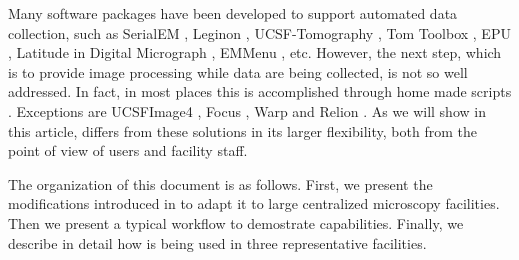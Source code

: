 Many software packages have been developed to support automated data collection, such as SerialEM \citep{Mastronarde2005}, Leginon \citep{Suloway2009}, UCSF-Tomography \citep{Zheng2007}, Tom Toolbox \citep{Nickell2005}, EPU \citep{EPU}, Latitude in Digital Micrograph \citep{Latitude}, EMMenu \citep{emmenu}, etc. However, the next step,  which is to provide image processing while  data are being collected, is not so well addressed. In fact, in most places this is accomplished through home made scripts \citep[e.g.][]{Pichkur2018}. %
Exceptions are UCSFImage4 \citep{Li2015}, Focus \citep{Biyani2017}, Warp \citep{warp2018} and Relion \citep{fernandez2017:relion-pipeline}. As we will show in this article, \scipion differs from these solutions in its larger flexibility, both from the point of view of users and facility staff.

The organization of this document is as follows. First, we present the modifications introduced in \scipion to adapt it to large centralized microscopy facilities. Then we present a typical workflow to demostrate \scipion capabilities. Finally,  we describe in detail how \scipion is being used in three representative facilities.

